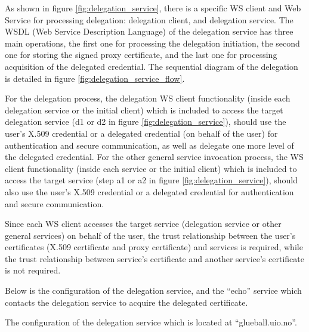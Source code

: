 \documentclass{article}                            %
\begin{document}
    As shown in figure \ref{fig:delegation_service}, there is a specific WS client and Web Service for processing delegation: delegation client, and delegation service. The WSDL (Web Service Description Language) of the delegation service has three main operations, the first one for processing the delegation initiation, the second one for storing the signed proxy certificate, and the last one for processing acquisition of the delegated credential. The sequential diagram of the delegation is detailed in figure \ref{fig:delegation_service_flow}.

\begin{figure}[ht]
\end{figure}

\begin{figure}[ht]
\end{figure}

    For the delegation process, the delegation WS client functionality (inside each delegation service or the initial client) which is included to access the target delegation service (d1 or d2 in figure \ref{fig:delegation_service}), should use the user’s X.509 credential or a delegated credential (on behalf of the user) for authentication and secure communication, as well as delegate one more level of the delegated credential. For the other general  service invocation process, the WS client functionality (inside each service or the initial client) which is included to access the target service (step a1 or a2 in figure \ref{fig:delegation_service}), should also use the user's X.509 credential or a delegated credential for authentication and secure communication.

    Since each WS client accesses the target service (delegation service or other general services) on behalf of the user, the trust relationship between the user's certificates (X.509 certificate and proxy certificate) and services is required, while the trust relationship between service's certificate and another service's certificate is not required.

Below is the configuration of the delegation service, and the ``echo'' service which contacts the delegation service to acquire the delegated certificate.

The configuration of the delegation service which is located at ``glueball.uio.no''.
\end{document}
